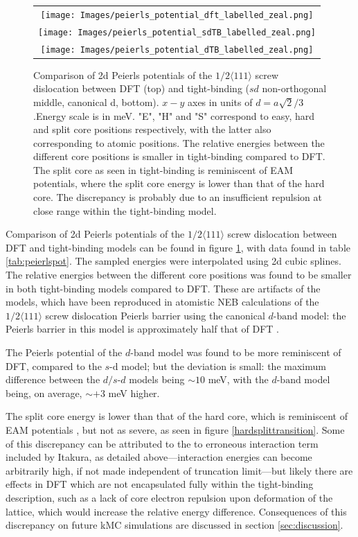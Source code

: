 \documentclass[a4paper,11pt]{article}
\numberwithin{equation}{chapter}
\numberwithin{listing}{chapter}
\begin{document}
        \begin{figure}
\centering
    \begin{tabular}{c}
	     \texttt{[image: Images/peierls\_potential\_dft\_labelled\_zeal.png]} \\
             \texttt{[image: Images/peierls\_potential\_sdTB\_labelled\_zeal.png]}  \\
             \texttt{[image: Images/peierls\_potential\_dTB\_labelled\_zeal.png]}  \\
    \end{tabular}
\caption{Comparison of 2d Peierls potentials of the $1/2\langle 111\rangle$ screw dislocation between DFT \cite{Itakura2012} (top) and tight-binding ($sd$ non-orthogonal middle, canonical d, bottom). $x-y$ axes in units of $d=a\sqrt{2} / 3$.Energy scale is in meV. "E", "H" and "S" correspond to easy, hard and split core positions respectively, with the latter also corresponding to atomic positions. The relative energies between the different core positions is smaller in tight-binding compared to DFT. The split core as seen in tight-binding is reminiscent of EAM potentials, where the split core energy is lower than that of the hard core. The discrepancy is probably due to an insufficient repulsion at close range within the tight-binding model.}
	\label{fig:peierlspot}
    \end{figure}



Comparison of 2d Peierls potentials of the \(1/2\langle 111 \rangle\)
screw dislocation between DFT and tight-binding models can be found in
figure \ref{fig:peierlspot}, with data found in table
\ref{tab:peierlspot}. The sampled energies were interpolated using 2d
cubic splines. The relative energies between the different core
positions was found to be smaller in both tight-binding models compared
to DFT. These are artifacts of the models, which have been reproduced in
atomistic NEB calculations of the \(1/2\langle 111\rangle\) screw
dislocation Peierls barrier using the canonical \(d\text{-band}\) model:
the Peierls barrier in this model is approximately half
that of DFT \cite{Simpson2019}.

The Peierls potential of the \(d\text{-band}\) model was found to be more
reminiscent of DFT, compared to the \(s\text{-d}\) model; but the
deviation is small: the maximum difference between the \(d\text{/}s\text{-}d\)
models being \(\sim 10\) meV, with the \(d\text{-band}\) model being, on average,
\(\sim+3\) meV higher.

The split core energy is lower than that of the hard
core, which is reminiscent of EAM potentials \cite{Itakura2012}, but not
as severe, as seen in figure \ref{hardsplittransition}. Some of
this discrepancy can be attributed to the to erroneous interaction term
included by Itakura, as detailed above---interaction energies can become
arbitrarily high, if not made independent of truncation limit---but
likely there are effects in DFT which are not encapsulated fully within
the tight-binding description, such as a lack of core electron repulsion
upon deformation of the lattice, which would increase the relative
energy difference. Consequences of this discrepancy on future kMC
simulations are discussed in section \ref{sec:discussion}.
\end{document}

